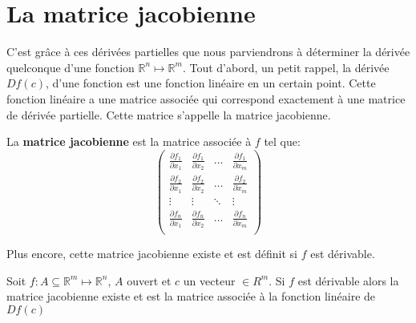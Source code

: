 \documentclass[12pt]{report}
\let\Bbb\mathbb
\theoremstyle{definition}
\begin{document}
\section{La matrice jacobienne}
    C'est grâce à ces dérivées partielles que nous parviendrons à déterminer la
    dérivée quelconque d'une fonction $\Bbb R^n \mapsto \Bbb R^m$. Tout d'abord, 
    un petit rappel, la dérivée $Df(c)$, d'une fonction est une fonction linéaire en 
    un certain point. Cette fonction linéaire a une matrice associée qui correspond
    exactement à une matrice de dérivée partielle. Cette matrice s'appelle la matrice 
    jacobienne.
    \begin{defi}
        \label{def:matrice_jacobienne}

        La \textbf{matrice jacobienne} est la matrice associée à  $f$ tel que:
        $$ \begin{pmatrix}
            \frac{\partial f_1}{\partial x_1} & \frac{\partial f_1}{\partial x_2} & \dots & \frac{\partial f_1}{\partial x_m} \\
            \frac{\partial f_2}{\partial x_1} & \frac{\partial f_2}{\partial x_2} & \dots & \frac{\partial f_2}{\partial x_m} \\
            \vdots & \vdots & \ddots & \vdots \\
            \frac{\partial f_n}{\partial x_1} & \frac{\partial f_n}{\partial x_2} & \dots & \frac{\partial f_n}{\partial x_m} \\
        \end{pmatrix}
        $$
    \end{defi}
    Plus encore, cette matrice jacobienne existe et est définit si $f$ est dérivable.
    \begin{prop}
        Soit $f: A \subseteq \Bbb R^m \mapsto \Bbb R^n$, $A$ ouvert et $c$ un vecteur $\in R^m$.
        Si $f$ est dérivable alors la matrice jacobienne existe et est la matrice associée à
        la fonction linéaire de $Df(c)$
    \end{prop}
\end{document}
